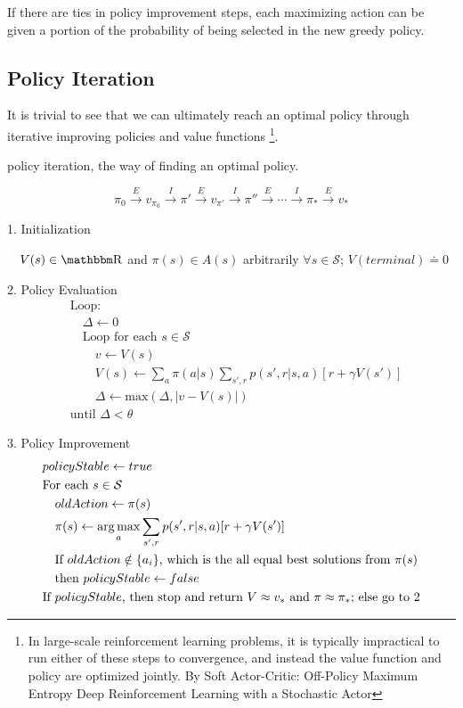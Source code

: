 \documentclass[sutton_barto_notes.tex]{subfiles}
\begin{document}
If there are ties in policy improvement steps, each maximizing action can be given a portion of the probability of being selected in the new greedy policy.

\subsection{Policy Iteration}

It is trivial to see that we can ultimately reach an optimal policy through iterative improving policies and value functions \footnote{In large-scale reinforcement learning problems, it is typically impractical to run either of these steps to convergence, and instead the value function and policy are optimized jointly. By Soft Actor-Critic: Off-Policy Maximum Entropy Deep Reinforcement Learning with a Stochastic Actor}.

\begin{definition}
policy iteration, the way of finding an optimal policy.

$$\pi_0 \xrightarrow{E} v_{\pi_0} \xrightarrow{I} \pi' \xrightarrow{E} v_{\pi'} \xrightarrow{I} \pi'' \xrightarrow{E} \cdots \xrightarrow{I} \pi_* \xrightarrow{E} v_* $$
\end{definition}

\begin{tcolorbox}[width=\textwidth,title={Policy Iteration (using iterative policy evaluation) for estimating $\pi \approx \pi_*$}]
1. Initialization

$\quad V(s) \in\R$ and $\pi(s) \in A(s)$ arbitrarily $\forall s \in \mathcal{S}$; $V(terminal) \doteq 0$

2. Policy Evaluation
\begin{align*}
&\text{Loop:}\\
&\quad\Delta \leftarrow 0\\
&\quad\text{Loop for each } s \in \mathcal{S}\\
&\quad\quad v \leftarrow V(s)\\
&\quad\quad V(s) \leftarrow \sum_a \pi (a|s) \sum_{s',r} p(s',r|s,a)[r + \gamma V(s')]\\
&\quad\quad \Delta \leftarrow \text{max}(\Delta, |v-V(s)|)\\
&\text{until } \Delta < \theta
\end{align*}

3. Policy Improvement
\begin{align*}
&policyStable \leftarrow true\\
&\text{For each } s \in \mathcal{S}\\
&\quad oldAction \leftarrow \pi(s)\\
&\quad \pi(s) \leftarrow \operatorname*{arg\,max}_a \sum_{s',r} p(s',r|s,a)[r+\gamma V(s')]\\
&\quad \text{If } oldAction \notin \{a_i\} \text{, which is the all equal best solutions from $\pi(s)$}\\
& \quad \text{then } policyStable \leftarrow false\\
&\text{If } policyStable \text{, then stop and return } V \approx v_* \text{ and } \pi \approx \pi_*\text{; else go to 2}	
\end{align*}
\end{tcolorbox}
\end{document}
